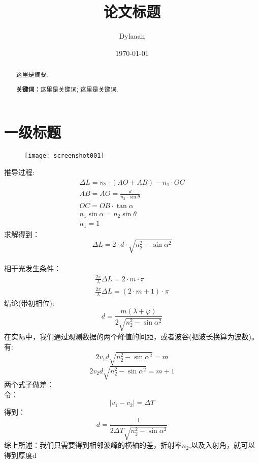 \documentclass[12pt, a4paper, oneside]{ctexart}
\title{\textbf{论文标题}}
\author{Dylaaan}
\date{\today}
\begin{document}
	
	\maketitle
	
	\setcounter{page}{0}
	\maketitle
	\thispagestyle{empty}
	
	\begin{abstract}
		这里是摘要. 
		\par\textbf{关键词：}这里是关键词; 这里是关键词. 
	\end{abstract}
	
	\newpage
	\setcounter{page}{1}
	\tableofcontents
	\newpage
	\setcounter{page}{1}
	
	\section{一级标题}
	
	
	
	

\begin{figure}[H]
	\centering
	\texttt{[image: screenshot001]}
	\caption{}
	\label{fig:screenshot001}
\end{figure}

推导过程:
\begin{align*}
	\Delta L = n_2 \cdot(AO + AB) -n_1\cdot OC\\
	AB = AO = \frac{d}{n_2 \cdot\sin\theta } \\
	OC = OB \cdot \tan\alpha \\
	n_1 \sin \alpha = n_2 \sin \theta \\
	n_1 = 1
\end{align*}
求解得到：\\
$$\Delta L = 2\cdot d \cdot \sqrt{n_2^2 - \sin \alpha^2} $$  \\
相干光发生条件：
\begin{align*}
	\frac{2\pi}{\lambda}\Delta L = 2\cdot m\cdot \pi  \\
	\frac{2\pi}{\lambda}\Delta L = (2\cdot m + 1 )\cdot \pi
\end{align*}
结论(带初相位):
$$ d = \frac{m (\lambda + \varphi)  }{2\sqrt{n_2^2 - \sin \alpha^2}}  $$
在实际中，我们通过观测数据的两个峰值的间距，或者波谷(把波长换算为波数)。有:
$$ 2v_1d\sqrt{n_2^2 - \sin \alpha^2} = m  $$
$$ 2v_2d\sqrt{n_2^2 - \sin \alpha^2} = m+1  $$
两个式子做差：\\
令： $$|v_1 - v_2| = \Delta T$$
得到：$$d = \frac{1}{2 \Delta T \sqrt{n_2^2 - \sin \alpha^2}}$$
综上所述：我们只需要得到相邻波峰的横轴的差，折射率$n_2$,以及入射角，就可以得到厚度d
	 
\end{document}
